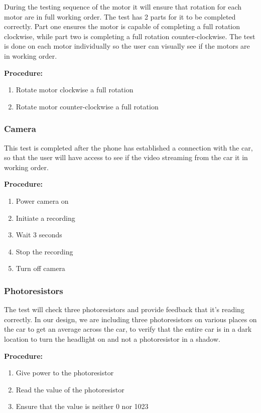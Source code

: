 \documentclass[letterpaper,12pt]{report}
\begin{document}
    During the testing sequence of the motor it will ensure that rotation for
    each motor are in full working order. The test has 2 parts for it to be
    completed correctly. Part one ensures the motor is capable of completing a
    full rotation clockwise, while part two is completing a full rotation
    counter-clockwise. The test is done on each motor individually so the user
    can visually see if the motors are in working order.

    \textbf{Procedure:}
    \begin{enumerate}
        \item Rotate motor clockwise a full rotation
        \item Rotate motor counter-clockwise a full rotation
    \end{enumerate}

    \subsubsection{Camera}

    This test is completed after the phone has established a connection with the
    car, so that the user will have access to see if the video streaming from
    the car it in working order.

    \textbf{Procedure:}
    \begin{enumerate}
        \item Power camera on
        \item Initiate a recording
        \item Wait 3 seconds
        \item Stop the recording
        \item Turn off camera
    \end{enumerate}

    \subsubsection{Photoresistors}

    The test will check three photoresistors and provide feedback that it's
    reading correctly. In our design, we are including three photoresistors on
    various places on the car to get an average across the car, to verify that
    the entire car is in a dark location to turn the headlight on and not a
    photoresistor in a shadow.

    \textbf{Procedure:}
    \begin{enumerate}
        \item  Give power to the photoresistor
        \item Read the value of the photoresistor
        \item Ensure that the value is neither 0 nor 1023
    \end{enumerate}
\end{document}
